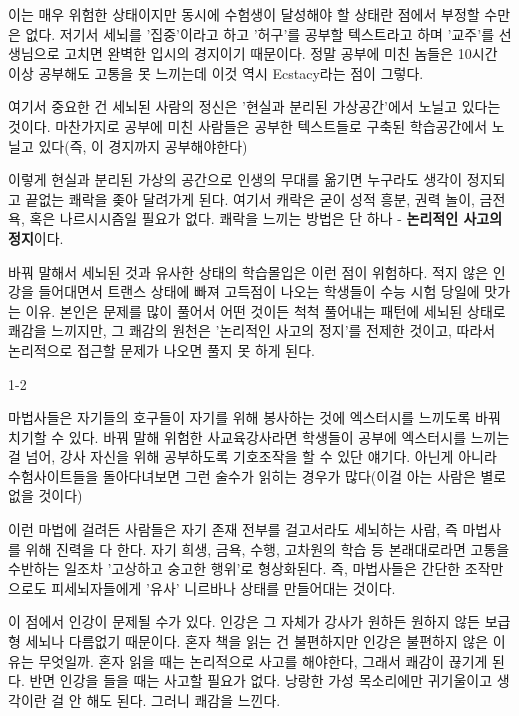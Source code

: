 이는 매우 위험한 상태이지만 동시에 수험생이 달성해야 할 상태란 점에서 부정할 수만은 없다.
저기서 세뇌를 '집중'이라고 하고 '허구'를 공부할 텍스트라고 하며 '교주'를 선생님으로 고치면 완벽한 입시의 경지이기 때문이다.
정말 공부에 미친 놈들은 10시간 이상 공부해도 고통을 못 느끼는데 이것 역시 Ecstacy라는 점이 그렇다.
\vspace{5mm}

여기서 중요한 건 세뇌된 사람의 정신은 '현실과 분리된 가상공간'에서 노닐고 있다는 것이다.
마찬가지로 공부에 미친 사람들은 공부한 텍스트들로 구축된 학습공간에서 노닐고 있다(즉, 이 경지까지 공부해야한다)
\vspace{5mm}

이렇게 현실과 분리된 가상의 공간으로 인생의 무대를 옮기면
누구라도 생각이 정지되고 끝없는 쾌락을 좆아 달려가게 된다.
여기서 캐락은 굳이 성적 흥분, 권력 놀이, 금전욕, 혹은 나르시시즘일 필요가 없다.
쾌락을 느끼는 방법은 단 하나 - \textbf{논리적인 사고의 정지}이다.
\vspace{5mm}

바꿔 말해서 세뇌된 것과 유사한 상태의 학습몰입은 이런 점이 위험하다.
적지 않은 인강을 들어대면서 트랜스 상태에 빠져 고득점이 나오는 학생들이 수능 시험 당일에 맛가는 이유.
본인은 문제를 많이 풀어서 어떤 것이든 척척 풀어내는 패턴에 세뇌된 상태로 쾌감을 느끼지만,
그 쾌감의 원천은 '논리적인 사고의 정지'를 전제한 것이고, 따라서 논리적으로 접근할 문제가 나오면 풀지 못 하게 된다.
\vspace{5mm}

1-2
\vspace{5mm}

마법사들은 자기들의 호구들이 자기를 위해 봉사하는 것에 엑스터시를 느끼도록 바꿔치기할 수 있다.
바꿔 말해 위험한 사교육강사라면 학생들이 공부에 엑스터시를 느끼는 걸 넘어, 강사 자신을 위해 공부하도록 기호조작을 할 수 있단 얘기다.
아닌게 아니라 수험사이트들을 돌아다녀보면 그런 술수가 읽히는 경우가 많다(이걸 아는 사람은 별로 없을 것이다)
\vspace{5mm}

이런 마법에 걸려든 사람들은 자기 존재 전부를 걸고서라도 세뇌하는 사람, 즉 마법사를 위해 진력을 다 한다.
자기 희생, 금욕, 수행, 고차원의 학습 등 본래대로라면 고통을 수반하는 일조차 '고상하고 숭고한 행위'로 형상화된다.
즉, 마법사들은 간단한 조작만으로도 피세뇌자들에게 '유사' 니르바나 상태를 만들어대는 것이다.
\vspace{5mm}

이 점에서 인강이 문제될 수가 있다. 인강은 그 자체가 강사가 원하든 원하지 않든 보급형 세뇌나 다름없기 때문이다.
혼자 책을 읽는 건 불편하지만 인강은 불편하지 않은 이유는 무엇일까.
혼자 읽을 때는 논리적으로 사고를 해야한다, 그래서 쾌감이 끊기게 된다.
반면 인강을 들을 때는 사고할 필요가 없다. 낭랑한 가성 목소리에만 귀기울이고 생각이란 걸 안 해도 된다. 그러니 쾌감을 느낀다.
\vspace{5mm}


